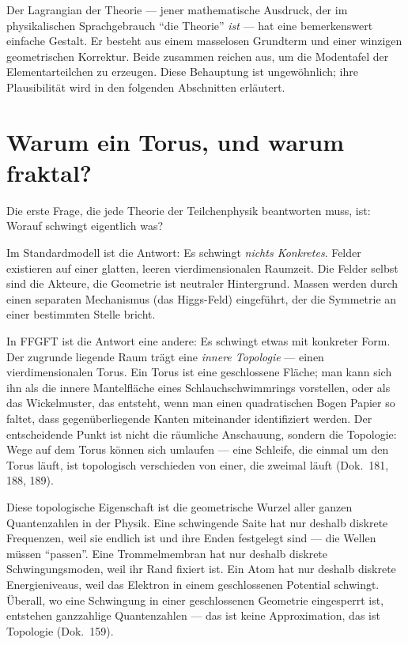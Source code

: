 Der Lagrangian der Theorie --- jener mathematische Ausdruck, der
im physikalischen Sprachgebrauch \enquote{die Theorie} \emph{ist} ---
hat eine bemerkenswert einfache Gestalt. Er besteht aus einem
masselosen Grundterm und einer winzigen geometrischen Korrektur. Beide
zusammen reichen aus, um die Modentafel der Elementarteilchen zu
erzeugen. Diese Behauptung ist ungewöhnlich; ihre Plausibilität wird
in den folgenden Abschnitten erläutert.

\section{Warum ein Torus, und warum fraktal?}

Die erste Frage, die jede Theorie der Teilchenphysik beantworten
muss, ist: Worauf schwingt eigentlich was?

Im Standardmodell ist die Antwort: Es schwingt \emph{nichts Konkretes}.
Felder existieren auf einer glatten, leeren vierdimensionalen
Raumzeit. Die Felder selbst sind die Akteure, die Geometrie ist
neutraler Hintergrund. Massen werden durch einen separaten
Mechanismus (das Higgs-Feld) eingeführt, der die Symmetrie an einer
bestimmten Stelle bricht.

In FFGFT ist die Antwort eine andere: Es schwingt etwas mit konkreter
Form. Der zugrunde liegende Raum trägt eine \emph{innere Topologie} ---
einen vierdimensionalen Torus. Ein Torus ist eine geschlossene
Fläche; man kann sich ihn als die innere Mantelfläche eines
Schlauchschwimmrings vorstellen, oder als das Wickelmuster, das
entsteht, wenn man einen quadratischen Bogen Papier so faltet, dass
gegenüberliegende Kanten miteinander identifiziert werden. Der
entscheidende Punkt ist nicht die räumliche Anschauung, sondern die
Topologie: Wege auf dem Torus können sich umlaufen --- eine Schleife,
die einmal um den Torus läuft, ist topologisch verschieden von einer,
die zweimal läuft (Dok.~181, 188, 189).

Diese topologische Eigenschaft ist die geometrische Wurzel aller
ganzen Quantenzahlen in der Physik. Eine schwingende Saite hat
nur deshalb diskrete Frequenzen, weil sie endlich ist und ihre Enden
festgelegt sind --- die Wellen müssen \enquote{passen}. Eine
Trommelmembran hat nur deshalb diskrete Schwingungsmoden, weil ihr
Rand fixiert ist. Ein Atom hat nur deshalb diskrete Energieniveaus,
weil das Elektron in einem geschlossenen Potential schwingt. Überall,
wo eine Schwingung in einer geschlossenen Geometrie eingesperrt ist,
entstehen ganzzahlige Quantenzahlen --- das ist keine Approximation,
das ist Topologie (Dok.~159).

